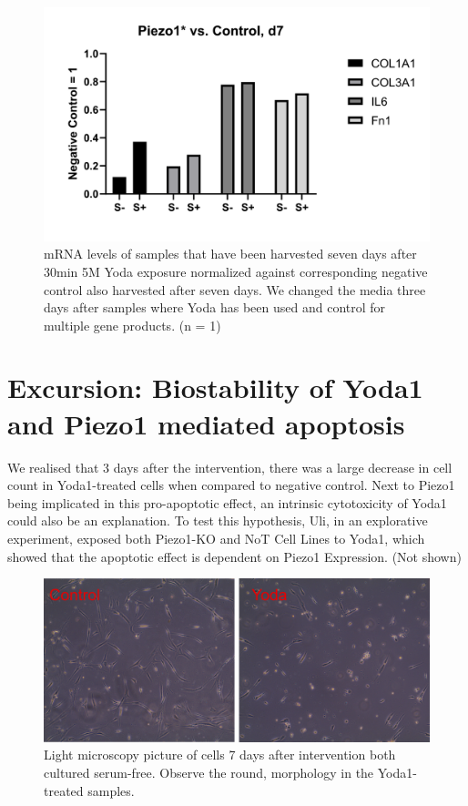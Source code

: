\begin{figure}
\centering
\includegraphics[width = \linewidth{}]{LongTerm_PCR.png}
\caption{mRNA levels of samples that have been harvested seven days after 30min 5\textmu{}M Yoda exposure normalized against corresponding negative control also harvested after seven days. We changed the media three days after samples where Yoda has been used and control for multiple gene products. (n = 1)}
\label{fig:LongTerm_PCR}
\end{figure}

\section{Excursion: Biostability of Yoda1 and Piezo1 mediated apoptosis}
\label{sec:biostability}
We realised that 3 days after the intervention, there was a large decrease in cell count in Yoda1-treated cells when compared to negative control. Next to Piezo1 being implicated in this pro-apoptotic effect, an intrinsic cytotoxicity of Yoda1 could also be an explanation. To test this hypothesis, Uli, in an explorative experiment, exposed both Piezo1-KO and NoT Cell Lines to Yoda1, which showed that the apoptotic effect is dependent on Piezo1 Expression. (Not shown)

\begin{figure}
\centering
\includegraphics[width = \linewidth]{Yoda_Apoptosis.png}
\caption{Light microscopy picture of cells 7 days after intervention both cultured serum-free. Observe the round,  morphology in the Yoda1-treated samples.}
\label{fig:yoda_apop}
\end{figure}